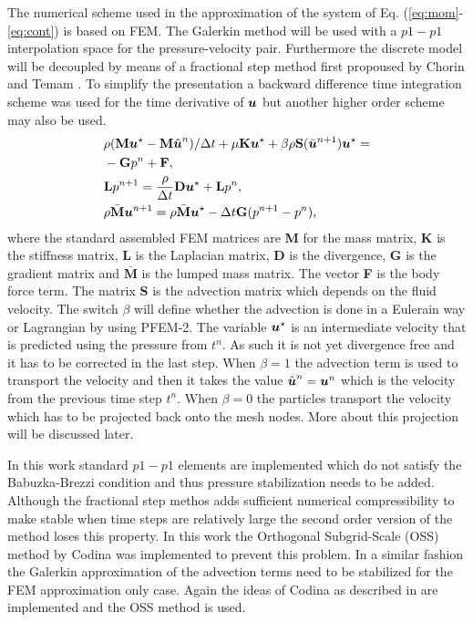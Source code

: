 The numerical scheme used in the approximation of the system of Eq. (\ref{eq:mom}-\ref{eq:cont}) is based on FEM. The Galerkin method will be used with a $p1-p1$ interpolation space for the pressure-velocity pair. Furthermore the discrete model will be decoupled by means of a fractional step method first propoused by Chorin \cite{chorin} and Temam \cite{temam}. To simplify the presentation a backward difference time integration scheme was used for the time derivative of $\boldsymbol{u}$ but another higher order scheme may also be used. 
%
\begin{align}\label{eq:masamat}
&\rho (\textbf{M}\boldsymbol{u}^\star-\textbf{M}\hat{\boldsymbol{u}}^n)/\Delta t+\mu\textbf{K}\boldsymbol{u}^{\star} +\beta\rho\textbf{S}(\bar{\boldsymbol{u}}^{n+1})\boldsymbol{u}^{\star}  = \nonumber\\&-\textbf{G}p^n+ \textbf{F},
\\\label{eq:matpres2}
& \textbf{L}p^{n+1}=\frac{\rho}{\Delta t}\textbf{D}\boldsymbol{u}^\star+ \textbf{L}  p^{n},
\\\label{eq:matunm2}
&\rho \bar{\textbf{M}}\boldsymbol{u}^{n+1}=\rho \bar{\textbf{M}}\boldsymbol{u}^\star-\Delta t\textbf{G}(p^{n+1}- p^n),
\end{align}
%
where the standard assembled FEM matrices are \textbf{M} for the mass matrix, \textbf{K} is the stiffness matrix, \textbf{L} is the Laplacian matrix, \textbf{D} is the divergence, \textbf{G} is the gradient matrix and $\bar{\textbf{M}}$ is the lumped mass matrix. The vector \textbf{F} is the body force term. The matrix \textbf{S} is the advection matrix which depends on the fluid velocity. The switch $\beta$ will define whether the advection is done in a Eulerain way or Lagrangian by using PFEM-2. The variable $\boldsymbol{u}^\star$ is an intermediate velocity that is predicted using the pressure from $t^n$. As such it is not yet divergence free and it has to be corrected in the last step. When $\beta=1$ the advection term is used to transport the velocity and then it takes the value  $\hat{\boldsymbol{u}}^n=\boldsymbol{u}^n$ which is the velocity from the previous time step $t^n$. When $\beta=0$ the particles transport the velocity which has to be projected back onto the mesh nodes. More about this projection will be discussed later.

In this work standard $p1-p1$ elements are implemented which do not satisfy the Babuzka-Brezzi condition and thus pressure stabilization needs to be added. Although the fractional step methos adds sufficient numerical compressibility to make stable when time steps are relatively large the second order version of the method loses this property. In this work the Orthogonal Subgrid-Scale (OSS) method by Codina \cite{codina-oss-press} was implemented to prevent this problem. In a similar fashion the Galerkin approximation of the advection terms need to be stabilized for the FEM approximation only case. Again the ideas of Codina as described in \cite{codina-soto} are implemented and the OSS method is used. 
